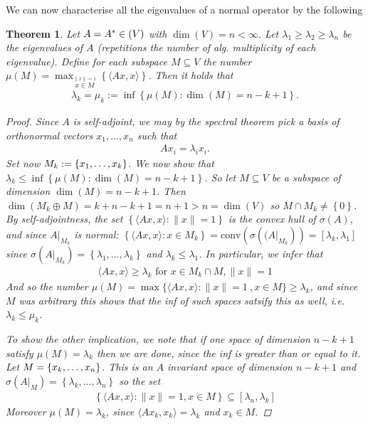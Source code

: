 \documentclass[10pt,twoside,openany,final]{memoir}
\theoremstyle{break}
\newtheorem{theorem}[section]{Theorem}
\theoremstyle{Break}
\newcommand{\lv}{\lVert}
\newcommand{\rv}{\rVert}
\let\End\relax
\DeclareMathOperator{\End}{End}
\let\Span\relax
\DeclareMathOperator{\Span}{Span}
\begin{document}
We can now characterise all the eigenvalues of a normal operator by the following

\begin{theorem}
	Let $A=A^* \in \End(V)$ with $\dim(V)=n < \infty$. Let $\lambda_1\geq \lambda_2 \geq \lambda_n$ be the eigenvalues of $A$ (repetitions the number of alg. multiplicity of each eigenvalue). Define for each subspace $M \subseteq V$ the number $\mu(M)=\max_{\stackrel{\lv x \rv = 1}{x \in M}} \left\{ \langle Ax,x\rangle \right\}$. Then it holds that
	\begin{align*}
		\lambda_k=\mu_k:=\inf\left\{ \mu(M) : \dim(M)=n-k+1 \right\}.
	\end{align*}
	\begin{proof}
	Since $A$ is self-adjoint, we may by the spectral theorem pick a basis of orthonormal vectors $x_1,\dots,x_n$ such that
	\begin{align*}
		Ax_i=\lambda_i x_i.
	\end{align*}
	Set now $M_k:=\Span\left\{ x_1,\dots,x_k \right\}$. We now show that $\lambda_k \leq \inf\left\{ \mu(M) : \dim(M)= n-k+1 \right\}$. So let $M \subseteq V$ be a subspace of dimension $\dim(M)=n-k+1$. Then $\dim(M_k \oplus M)=k+n-k+1=n+1>n=\dim(V)$ so $M \cap M_k \neq \left\{ 0 \right\}$. By self-adjointness, the set $\left\{ \langle Ax,x \rangle : \lv x \rv =1 \right\}$ is the convex hull of $\sigma(A)$, and since $A\big|_{M_k}$ is normal: $\left\{ \langle Ax,x \rangle : x \in M_k \right\}=\textrm{conv}\left(\sigma\left((A\big|_{M_k}\right)\right)=[\lambda_k,\lambda_1]$ since $\sigma(A\big|_{M_k})=\left\{ \lambda_1,\dots,\lambda_k \right\} $ and $\lambda_k \leq \lambda_1$. In particular, we infer that
	\begin{align*}
		\langle Ax,x \rangle  \geq \lambda_k \text{ for } x \in M_k \cap M, \lv x \rv = 1
	\end{align*}
	And so the number $\mu(M)=\max\{\langle Ax, x \rangle : \lv x \rv = 1  \ , x \in M\} \geq \lambda_k$, and since $M$ was arbitrary this shows that the inf of such spaces satsify this as well, i.e. $\lambda_k \leq \mu_k$. 

	To show the other implication, we note that if one space of dimension $n-k+1$ satisfy $\mu(M)=\lambda_k$ then we are done, since the inf is greater than or equal to it. Let $M=\Span\left\{ x_k,\dots,x_n \right\}$. This is an $A$ invariant space of dimension $n-k+1$ and $\sigma(A\big|_{M})=\left\{ \lambda_k,\dots,\lambda_n \right\}$ so the set  
	\begin{align*}
		\left\{ \langle Ax,x \rangle : \lv x \rv = 1 , x \in M \right\} \subseteq [\lambda_n,\lambda_k]
	\end{align*}
	Moreover $\mu(M)=\lambda_k$, since $\langle Ax_k,x_k \rangle = \lambda_k$ and $x_k \in M$.
	
	\end{proof}
\end{theorem}
\end{document}
